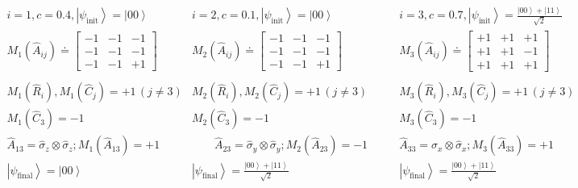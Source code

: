 \documentclass[british,aps,prl,superscriptaddress,nofootinbib,times,reprint]{revtex4-1}
\theoremstyle{plain}
\theoremstyle{plain}
\theoremstyle{definition}
\theoremstyle{remark}
\theoremstyle{remark}
\theoremstyle{remark}
\theoremstyle{plain}
\theoremstyle{plain}
\theoremstyle{plain}
\theoremstyle{definition}
\theoremstyle{definition}
\begin{document}
\begin{table}
 \begin{equation*}
\begin{array}{ccc} 
i=1,c=0.4,\left|\psi_{\text{init}}\right\rangle=\left|00\right\rangle & i=2,c=0.1,\left|\psi_{\text{init}}\right\rangle=\left|00\right\rangle & i=3,c=0.7,\left|\psi_{\text{init}}\right\rangle=\frac{\left|00\right\rangle +\left|11\right\rangle}{\sqrt{2}} \\

M_{1}(\hat{A}_{ij})\doteq\left[\begin{array}{ccc} -1 & -1 & -1\\ -1 & -1 & -1\\ -1 & -1 & +1\end{array}\right] &
M_{2}(\hat{A}_{ij})\doteq\left[\begin{array}{ccc}-1 & -1 & -1\\ -1 & -1 & -1\\ -1 & -1 & +1\end{array}\right] &
M_{3}(\hat{A}_{ij})\doteq\left[\begin{array}{ccc}+1 & +1 & +1\\ +1 & +1 & -1\\ +1 & +1 & +1\end{array}\right]\\ \\


M_{1}(\hat{R}_{i}),M_{1}(\hat{C}_{j})=+1\,(j\neq3) &
M_{2}(\hat{R}_{i}),M_{2}(\hat{C}_{j})=+1\,(j\neq3) &
M_{3}(\hat{R}_{i}),M_{3}(\hat{C}_{j})=+1\,(j\neq3)\\

M_{1}(\hat{C}_{3})=-1 & M_{2}(\hat{C}_{3})=-1 & M_{3}(\hat{C}_{3})=-1\\ 


\hat{A}_{13}=\hat{\sigma}_{z}\otimes\hat{\sigma}_{z};M_{1}(\hat{A}_{13})=+1&
\quad\quad\hat{A}_{23}=\hat{\sigma}_{y}\otimes\hat{\sigma}_{y};M_{2}(\hat{A}_{23})=-1\quad\quad&
\hat{A}_{33}=\hat{\sigma}_{x}\otimes\hat{\sigma}_{x};M_{3}(\hat{A}_{33})=+1\\

\left|\psi_{\text{final}}\right\rangle = \left|00\right\rangle  & \left|\psi_{\text{final}}\right\rangle = \frac{\left|00\right\rangle +\left|11\right\rangle}{\sqrt{2}} & \left|\psi_{\text{final}}\right\rangle = \frac{\left|00\right\rangle+\left|11\right\rangle }{\sqrt{2}}


\end{array}
\end{equation*}
\end{table}
\end{document}
